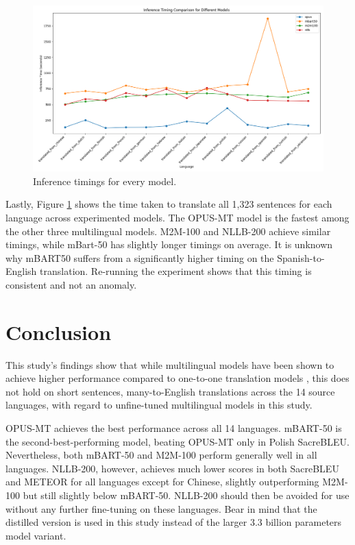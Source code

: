 \documentclass[a4paper, 11pt]{article}
\begin{document}
\begin{figure}[htbp]
    \centering
    \includegraphics[width=0.9\linewidth]{figures/inference_timings.png}
    \caption{Inference timings for every model.}
    \label{fig:inference_timings}
\end{figure}

Lastly, Figure \ref{fig:inference_timings} shows the time taken to translate all 1,323 sentences for each language across experimented models. The OPUS-MT model is the fastest among the other three multilingual models. M2M-100 and NLLB-200 achieve similar timings, while mBart-50 has slightly longer timings on average. It is unknown why mBART50 suffers from a significantly higher timing on the Spanish-to-English translation. Re-running the experiment shows that this timing is consistent and not an anomaly.


\section{Conclusion}

This study's findings show that while multilingual models have been shown to achieve higher performance compared to one-to-one translation models \cite{liu-2020-mbart}, this does not hold on short sentences, many-to-English translations across the 14 source languages, with regard to unfine-tuned multilingual models in this study.

OPUS-MT achieves the best performance across all 14 languages. mBART-50 is the second-best-performing model, beating OPUS-MT only in Polish SacreBLEU. Nevertheless, both mBART-50 and M2M-100 perform generally well in all languages. NLLB-200, however, achieves much lower scores in both SacreBLEU and METEOR for all languages except for Chinese, slightly outperforming M2M-100 but still slightly below mBART-50. NLLB-200 should then be avoided for use without any further fine-tuning on these languages. Bear in mind that the distilled version is used in this study instead of the larger 3.3 billion parameters model variant.
\end{document}
